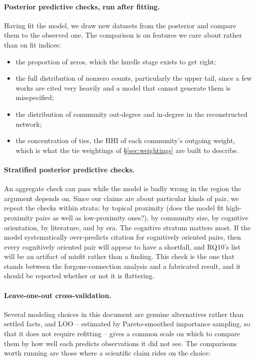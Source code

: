 \documentclass[11pt]{article}
\begin{document}
\paragraph{Posterior predictive checks, run after fitting.} Having fit the model, we draw new
datasets from the posterior and compare them to the observed one. The comparison is on
features we care about rather than on fit indices:

\begin{itemize}[leftmargin=2em, itemsep=1pt]
  \item the proportion of zeros, which the hurdle stage exists to get right;
  \item the full distribution of nonzero counts, particularly the upper tail, since a few
        works are cited very heavily and a model that cannot generate them is misspecified;
  \item the distribution of community out-degree and in-degree in the reconstructed network;
  \item the concentration of ties, the HHI of each community's outgoing weight, which is what
        the tie weightings of \S\ref{sec:weightings} are built to describe.
\end{itemize}

\paragraph{Stratified posterior predictive checks.} An aggregate check can pass while the
model is badly wrong in the region the argument depends on. Since our claims are about
particular kinds of pair, we repeat the checks within strata: by topical proximity (does the
model fit high-proximity pairs as well as low-proximity ones?), by community size, by
cognitive orientation, by literature, and by era. The cognitive stratum matters most. If the
model systematically over-predicts citation for cognitively oriented pairs, then every
cognitively oriented pair will appear to have a shortfall, and RQ10's list will be an artifact
of misfit rather than a finding. This check is the one that stands between the forgone-connection
analysis and a fabricated result, and it should be reported whether or not it is flattering.

\paragraph{Leave-one-out cross-validation.} Several modeling choices in this document are
genuine alternatives rather than settled facts, and LOO -- estimated by Pareto-smoothed
importance sampling, so that it does not require refitting -- gives a common scale on which to
compare them by how well each predicts observations it did not see. The comparisons worth
running are those where a scientific claim rides on the choice:
\end{document}
